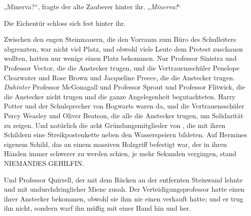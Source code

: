 „Minerva?“, fragte der alte Zauberer hinter ihr. „\emph{Minerva!}“

Die Eichentür schloss sich fest hinter ihr.

\later

Zwischen den engen Steinmauern, die den Vorraum zum Büro des Schulleiters abgrenzten, war nicht viel Platz, und obwohl viele Leute dem Protest zuschauen wollten, hatten nur wenige einen Platz bekommen. Nur Professor Sinistra und Professor Vector, die die Anstecker trugen, und die Vertrauensschüler Penelope Clearwater und Rose Brown und Jacqueline Preece, die die Anstecker trugen. \emph{Dahinter} Professor McGonagall und Professor Sprout und Professor Flitwick, die die Anstecker nicht trugen und die ganze Angelegenheit begutachteten. Harry Potter und der Schulsprecher von Hogwarts waren da, und die Vertrauensschüler Percy Weasley und Oliver Beatson, die alle die Anstecker trugen, um Solidarität zu zeigen. Und natürlich die acht Gründungsmitglieder von \SPHEW, die mit ihren Schildern eine Streikpostenkette neben den Wasserspeiern bildeten. Auf Hermines eigenem Schild, das an einem massiven Holzgriff befestigt war, der in ihren Händen immer schwerer zu werden schien, je mehr Sekunden vergingen, stand NIEMANDES GEHILFIN.

Und Professor Quirrell, der mit dem Rücken an der entfernten Steinwand lehnte und mit undurchdringlicher Miene zusah. Der Verteidigungsprofessor hatte einen ihrer Anstecker bekommen, obwohl sie ihm nie einen verkauft hatte; und er trug ihn nicht, sondern warf ihn müßig mit einer Hand hin und her.

